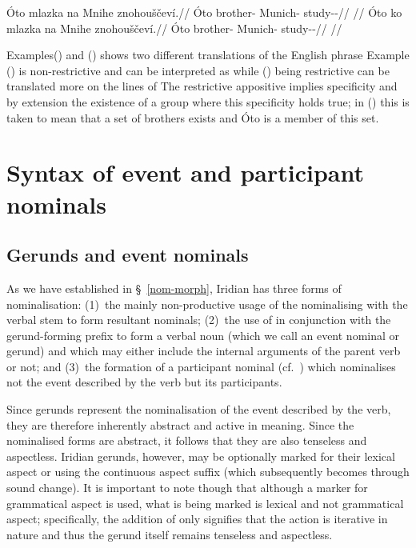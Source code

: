\pex\a
\begingl{}
    \gla \'Oto mlazka na Mnihe znohouščeví.//
    \glb  \'Oto brother-\Dim{} \Loc{} Munich-\Acc{} study-\Av{}-\Cont{}//
    \glft {}//
\endgl
\a\begingl{}
    \gla \'Oto {ko} mlazka na Mnihe znohouščeví.//
    \glb  \'Oto \Lnk{} brother-\Dim{} \Loc{} Munich-\Acc{} study-\Av{}-\Cont{}//
    \glft {}//
\endgl
\xe

Examples() and () shows two different translations of the English phrase  Example () is non-restrictive and can be interpreted as  while () being restrictive can be translated more on the lines of  The restrictive appositive implies specificity and by extension the existence of a group where this specificity holds true; in () this is taken to mean that a set of brothers exists and \'Oto is a member of this set.


\section{Syntax of event and participant nominals}\label{sec:nomz-syntax}

\subsection{Gerunds and event nominals}

As we have established in \S~\ref{nom-morph}, Iridian has three forms of nominalisation: (1)~the mainly non-productive usage of the nominalising  with the verbal stem to form resultant nominals; (2)~the use of  in conjunction with the gerund-forming prefix  to form a verbal noun (which we call an event nominal or gerund) and which may either include the internal arguments of the parent verb or not; and (3)~the formation of a participant nominal (cf.~\cite{okuna}) which nominalises not the event described by the verb but its participants.

Since gerunds represent the nominalisation of the event described by the verb, they are therefore inherently abstract and active in meaning. Since the nominalised forms are abstract, it follows that they are also tenseless and aspectless. Iridian gerunds, however, may be optionally marked for their lexical aspect or  using the continuous aspect suffix  (which subsequently becomes  through sound change). It is important to note though that although a marker for grammatical aspect is used, what is being marked is lexical and not grammatical aspect; specifically, the addition of  only signifies that the action is iterative in nature and thus the gerund itself remains tenseless and aspectless.

